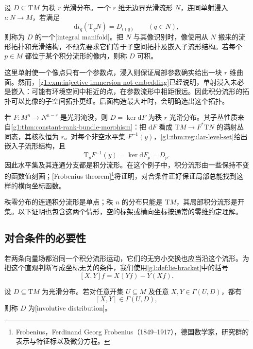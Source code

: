 \begin{definition}\label{g1:def:integral-manifold}
	设 \(D\subseteq \mathrm{T}M\) 为秩 \(r\) 光滑分布。一个 \(r\) 维无边界光滑流形 \(N\)，连同单射浸入 \(\iota:N\to M\)，若满足
	\[
		\mathrm{d}\iota_q(\mathrm{T}_qN)=D_{\iota(q)}\qquad(q\in N),
	\]
	则称为 \(D\) 的一个[integral manifold]。把 \(N\) 与其像识别时，像使用从 \(N\) 搬来的流形拓扑和光滑结构，不预先要求它们等于子空间拓扑及嵌入子流形结构。若每个 \(p\in M\) 都位于某个积分流形的像内，则称 \(D\) 可积。
\end{definition}

这里单射使一个像点只有一个参数点，浸入则保证局部参数确实给出一块 \(r\) 维曲面。然而，\cref{g1:exm:injective-immersion-not-embedding}已经说明，单射浸入未必是嵌入：可能有环境空间中相近的点，在参数流形中相距很远。因此积分流形的拓扑可以比像的子空间拓扑更细。后面构造最大叶时，会明确选出这个拓扑。

\begin{example}\label{g1:exm:submersion-integral-levels}
	若 \(F:M^n\to N^{n-r}\) 是光滑淹没，则 \(D=\ker\mathrm{d}F\) 为秩 \(r\) 光滑分布。其子丛性质来自\cref{g1:thm:constant-rank-bundle-morphism}：把 \(\mathrm{d}F\) 看成 \(\mathrm{T}M\to F^*\mathrm{T}N\) 的满射丛同态，其核秩恒为 \(r\)。对每个非空水平集 \(F^{-1}(y)\)，\cref{g1:thm:regular-level-set}给出嵌入子流形结构，且
	\[
		\mathrm{T}_pF^{-1}(y)=\ker\mathrm{d}F_p=D_p.
	\]
	因此水平集及其连通分支都是积分流形。在这个例子中，积分流形由一些保持不变的函数值刻画；[Frobenius theorem]\footnote{Frobenius，Ferdinand Georg Frobenius（1849--1917），德国数学家，研究群的表示与特征标以及微分方程。}将证明，对合条件正好保证局部总能找到这样的横向坐标函数。
\end{example}

秩零分布的连通积分流形是单点；秩 \(n\) 的分布只能是 \(\mathrm{T}M\)，其局部积分流形是开集。以下证明也包含这两个情形，空的标架或横向坐标按通常的零维约定理解。

\subsection{对合条件的必要性}
\label{g1:subsec:1304:02}

若两条向量场都沿同一个积分流形运动，它们的无穷小交换也应当沿这个流形。为把这个直观判断写成坐标无关的条件，我们使用\cref{g1:def:lie-bracket}中的括号
\[
	[X,Y]f=X(Yf)-Y(Xf).
\]

\begin{definition}\label{g1:def:involutive-distribution}
	设 \(D\subseteq \mathrm{T}M\) 为光滑分布。若对任意开集 \(U\subseteq M\) 及任意 \(X,Y\in\Gamma(U,D)\)，都有
	\[
		[X,Y]\in\Gamma(U,D),
	\]
	则称 \(D\) 为[involutive distribution]。
\end{definition}

